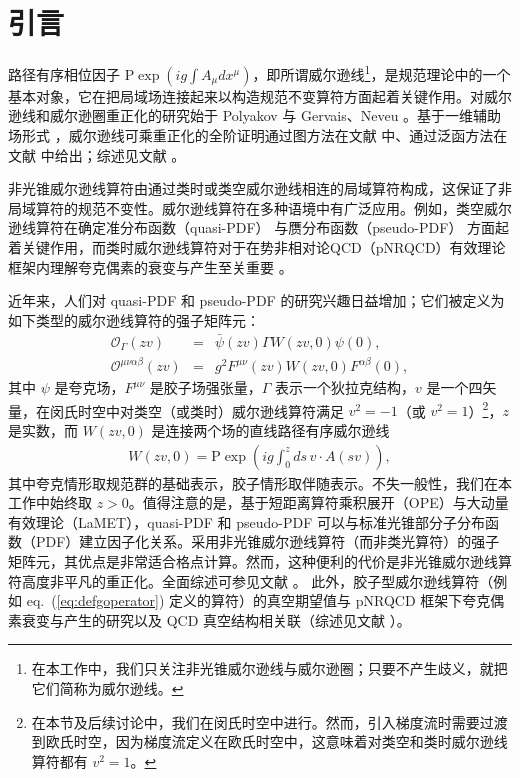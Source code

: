 \section{引言}
路径有序相位因子 $\text{P}\exp\left(ig\int A_{\mu} dx^{\mu}\right)$，即所谓威尔逊线\footnote{在本工作中，我们只关注非光锥威尔逊线与威尔逊圈；只要不产生歧义，就把它们简称为威尔逊线。}，是规范理论中的一个基本对象，它在把局域场连接起来以构造规范不变算符方面起着关键作用。对威尔逊线和威尔逊圈重正化的研究始于 Polyakov \cite{Polyakov:1980ca} 与 Gervais、Neveu \cite{Gervais:1979fv}。基于一维辅助场形式 \cite{Gervais:1979fv,Arefeva:1980zd, Arefeva:1980uy,Samuel:1978iy,Brandt:1978wc}，威尔逊线可乘重正化的全阶证明通过图方法在文献 \cite{Dotsenko:1979wb,Craigie:1980qs} 中、通过泛函方法在文献 \cite{Dorn:1986dt} 中给出；综述见文献 \cite{Dorn:1986dt}。

非光锥威尔逊线算符由通过类时或类空威尔逊线相连的局域算符构成，这保证了非局域算符的规范不变性。威尔逊线算符在多种语境中有广泛应用。例如，类空威尔逊线算符在确定准分布函数（quasi-PDF）\cite{Ji:2013dva} 与赝分布函数（pseudo-PDF）\cite{Radyushkin:2017cyf} 方面起着关键作用，而类时威尔逊线算符对于在势非相对论QCD（pNRQCD）有效理论框架内理解夸克偶素的衰变与产生至关重要 \cite{Pineda:1997bj,Brambilla:1999xf,Brambilla:2004jw,Brambilla:2001xy,Brambilla:2002nu,Brambilla:2020ojz,Brambilla:2021abf,Brambilla:2022rjd,Brambilla:2022ayc}。

近年来，人们对 quasi-PDF 和 pseudo-PDF 的研究兴趣日益增加；它们被定义为如下类型的威尔逊线算符的强子矩阵元：
\begin{eqnarray}
\label{eq:defqoperator}
\mathcal{O}_{\Gamma}(zv) &=& \bar{\psi}(zv)\Gamma W(zv,0)\psi(0),\\
\label{eq:defgoperator}
\mathcal{O}^{\mu\nu\alpha\beta} (zv)&=& g^2 F^{\mu\nu}(zv)W(zv,0)F^{\alpha\beta}(0),
\end{eqnarray}
其中 $\psi$ 是夸克场，$F^{\mu\nu}$ 是胶子场强张量，$\Gamma$ 表示一个狄拉克结构，$v$ 是一个四矢量，在闵氏时空中对类空（或类时）威尔逊线算符满足 $v^2=-1$（或 $v^2=1$）\footnote{在本节及后续讨论中，我们在闵氏时空中进行。然而，引入梯度流时需要过渡到欧氏时空，因为梯度流定义在欧氏时空中，这意味着对类空和类时威尔逊线算符都有 $v^2=1$。}，$z$ 是实数，而 $W(zv, 0)$ 是连接两个场的直线路径有序威尔逊线
\begin{eqnarray}
W(zv, 0) = \text{P}\exp\left(ig\int_0^z ds\, v\cdot A(sv) \right),
\end{eqnarray}
其中夸克情形取规范群的基础表示，胶子情形取伴随表示。不失一般性，我们在本工作中始终取 $z>0$。值得注意的是，基于短距离算符乘积展开（OPE）与大动量有效理论（LaMET）\cite{Braun:2007wv, Ji:2014gla,Izubuchi:2018srq}，quasi-PDF 和 pseudo-PDF 可以与标准光锥部分子分布函数（PDF）建立因子化关系。采用非光锥威尔逊线算符（而非类光算符）的强子矩阵元，其优点是非常适合格点计算。然而，这种便利的代价是非光锥威尔逊线算符高度非平凡的重正化。全面综述可参见文献 \cite{Ji:2020ect}。
此外，胶子型威尔逊线算符（例如 eq.~(\ref{eq:defgoperator}) 定义的算符）的真空期望值与 pNRQCD 框架下夸克偶素衰变与产生的研究以及 QCD 真空结构相关联（综述见文献 \cite{DiGiacomo:2000irz}）。

